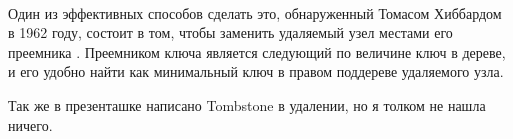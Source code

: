 \vspace{3mm}
\\
Один из эффективных способов сделать это, обнаруженный Томасом Хиббардом в 1962 году, состоит в том, чтобы заменить удаляемый узел местами его преемника . Преемником ключа является следующий по величине ключ в дереве, и его удобно найти как минимальный ключ в правом поддереве удаляемого узла.

Так же в презенташке написано Tombstone в удалении, но я толком не нашла ничего.
